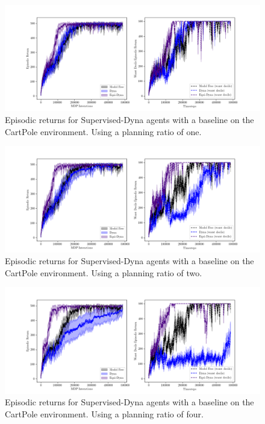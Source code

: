 \begin{figure}[h!]
	\centering
	\includegraphics[width=\textwidth]{Figures/Expert_dyna_cp_pr1.png}
	\caption{Episodic returns for Supervised-Dyna agents with a baseline on the CartPole environment. Using a planning ratio of one.}
\end{figure}
\begin{figure}[h!]
	\centering
	\includegraphics[width=\textwidth]{Figures/Expert_dyna_cp_pr2.png}
	\caption{Episodic returns for Supervised-Dyna agents with a baseline on the CartPole environment. Using a planning ratio of two.}
\end{figure}
\begin{figure}[h!]
	\centering
	\includegraphics[width=\textwidth]{Figures/Expert_dyna_cp_pr4.png}
	\caption{Episodic returns for Supervised-Dyna agents with a baseline on the CartPole environment. Using a planning ratio of four.}
\end{figure}
